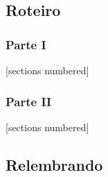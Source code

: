 \documentclass[10pt, compress, aspectratio=43, xcolor={table,usenames,dvipsnames}]{beamer}
\begin{document}
\subsection{Roteiro}

\begin{frame}
    \frametitle{Parte I}
    [sections numbered]
    \tableofcontents[hideallsubsections, part=1]
\end{frame}

\begin{frame}
    \frametitle{Parte II}
    [sections numbered]
    \tableofcontents[hideallsubsections, part=2]
\end{frame}

%

\subsection{Relembrando}
\end{document}
